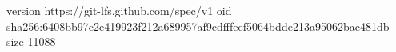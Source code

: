 version https://git-lfs.github.com/spec/v1
oid sha256:6408bb97c2e419923f212a689957af9cdfffeef5064bdde213a95062bac481db
size 11088
